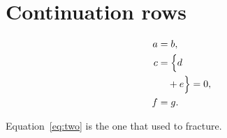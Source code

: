 \section{Continuation rows}

\begin{align}
a &= b, \label{eq:one}\\
c &= \Bigl\{ d \nonumber\\
&\quad + e \Bigr\} = 0, \label{eq:two}\\
f &= g. \label{eq:three}
\end{align}

Equation~\eqref{eq:two} is the one that used to fracture.
